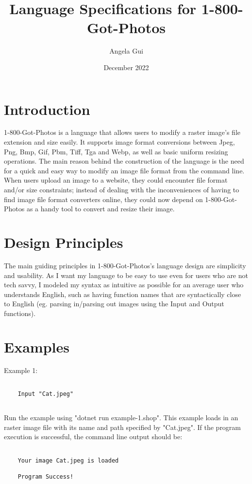 \documentclass{article}
\title{Language Specifications for 1-800-Got-Photos}
\author{Angela Gui}
\date{December 2022}
\begin{document}
\maketitle

\section{Introduction}

1-800-Got-Photos is a language that allows users to modify a raster image's file extension and size easily. It supports image format conversions between Jpeg, Png, Bmp, Gif, Pbm, Tiff, Tga and Webp, as well as basic uniform resizing operations. The main reason behind the construction of the language is the need for a quick and easy way to modify an image file format from the command line. When users upload an image to a website, they could encounter file format and/or size constraints; instead of dealing with the inconveniences of having to find image file format converters online, they could now depend on 1-800-Got-Photos as a handy tool to convert and resize their image.

\section{Design Principles}

The main guiding principles in 1-800-Got-Photos's language design are simplicity and usability. As I want my language to be easy to use even for users who are not tech savvy, I modeled my syntax as intuitive as possible for an average user who understands English, such as having function names that are syntactically close to English (eg. parsing in/parsing out images using the Input and Output functions).

\section{Examples}

    Example 1: \begin{verbatim}

    Input "Cat.jpeg"
        
    \end{verbatim}

Run the example using "dotnet run example-1.shop". This example loads in an raster image file with its name and path specified by "Cat.jpeg". If the program execution is successful, the command line output should be: 
    \begin{verbatim}

    Your image Cat.jpeg is loaded 

    Program Success!

        
    \end{verbatim}
    
\end{document}
